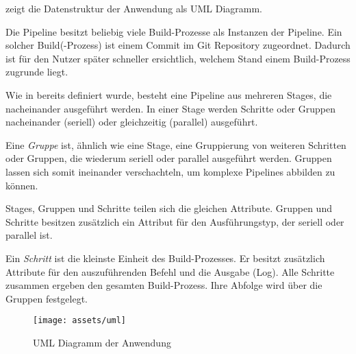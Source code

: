  zeigt die Datenstruktur der Anwendung als UML Diagramm.

Die Pipeline besitzt beliebig viele Build-Prozesse als Instanzen der Pipeline. Ein solcher Build(-Prozess) ist einem Commit im Git Repository zugeordnet. Dadurch ist für den Nutzer später schneller ersichtlich, welchem Stand einem Build-Prozess zugrunde liegt.

Wie in  bereits definiert wurde, besteht eine Pipeline aus mehreren Stages, die nacheinander ausgeführt werden. In einer Stage werden Schritte oder Gruppen nacheinander (seriell) oder gleichzeitig (parallel) ausgeführt.

Eine \emph{Gruppe} ist, ähnlich wie eine Stage, eine Gruppierung von weiteren Schritten oder Gruppen, die wiederum seriell oder parallel ausgeführt werden. Gruppen lassen sich somit ineinander verschachteln, um komplexe Pipelines abbilden zu können.

Stages, Gruppen und Schritte teilen sich die gleichen Attribute. Gruppen und Schritte besitzen zusätzlich ein Attribut für den Ausführungstyp, der seriell oder parallel ist.

Ein \emph{Schritt} ist die kleinste Einheit des Build-Prozesses. Er besitzt zusätzlich Attribute für den auszuführenden Befehl und die Ausgabe (Log). Alle Schritte zusammen ergeben den gesamten Build-Prozess. Ihre Abfolge wird über die Gruppen festgelegt.

\begin{figure}[h]
  \caption{UML Diagramm der Anwendung}
  \label{fig:uml}
  \centering
    \texttt{[image: assets/uml]}
\end{figure}

